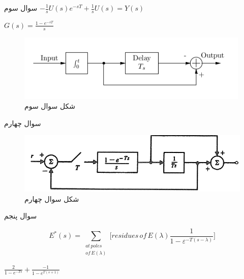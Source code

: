 \documentclass{article}
\begin{document}
    \begin{problem}{سوال سوم}
    	\raggedleft
    	$-\frac{1}{s}U(s)e^{-sT} + \frac{1}{s}U(s) = Y(s)$
    	
    	
    	$G(s) = \frac{1-e^{-sT}}{s}$ 
    	
    	
    \end{problem}
    \begin{figure}[htbp]
    	\centering
    	\includegraphics{Second Series/4.png}
    	\caption{شکل سوال سوم}
    \end{figure}
    
    
    \begin{problem}{سوال چهارم}
    	
    	
    \end{problem}
    \begin{figure}[htbp]
    	\includegraphics[width=\linewidth]{Second Series/5.png}
    	\caption{شکل سوال چهارم}
    \end{figure}
    
    \begin{problem}{سوال پنجم}
    	
    		\begin{equation}
    			{{E}^{*}}(s)=\sum\limits_{\begin{smallmatrix} 
    					at\,poles\, \\ 
    					of\,E(\lambda ) 
    			\end{smallmatrix}}{[residues\,of\,E(\lambda )}\frac{1}{1-{{\varepsilon }^{-T(s-\lambda )}}}]
    		\end{equation}
    		
    		\raggedleft
    		\centering
    		
    		$\frac{2}{1-e^{-Ts}} + \frac{-1}{1-e^{T(s+1)}}$
    	
    \end{problem}
\raggedleft    
\end{document}
